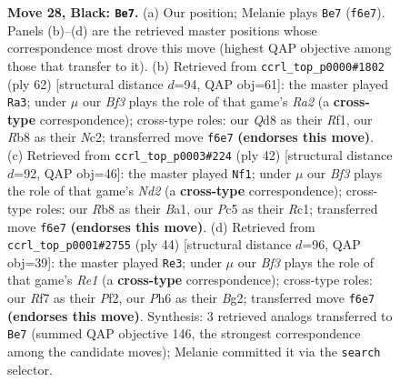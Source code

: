 \documentclass[11pt]{article}
\begin{document}
\begin{figure}[p]
\caption{\textbf{Move 28, Black: \texttt{Be7}.} (a) Our position; Melanie plays \texttt{Be7} (\texttt{f6e7}). Panels (b)--(d) are the retrieved master positions whose correspondence most drove this move (highest QAP objective among those that transfer to it). (b) Retrieved from \texttt{ccrl\_top\_p0000\#1802} (ply 62) [structural distance $d$=94, QAP obj=61]: the master played \texttt{Ra3}; under $\mu$ our \emph{Bf3} plays the role of that game's \emph{Ra2} (a \textbf{cross-type} correspondence); cross-type roles: our \emph{Q}d8 as their \emph{R}f1, our \emph{R}b8 as their \emph{N}c2; transferred move \texttt{f6e7} \textbf{(endorses this move)}. (c) Retrieved from \texttt{ccrl\_top\_p0003\#224} (ply 42) [structural distance $d$=92, QAP obj=46]: the master played \texttt{Nf1}; under $\mu$ our \emph{Bf3} plays the role of that game's \emph{Nd2} (a \textbf{cross-type} correspondence); cross-type roles: our \emph{R}b8 as their \emph{B}a1, our \emph{P}c5 as their \emph{R}c1; transferred move \texttt{f6e7} \textbf{(endorses this move)}. (d) Retrieved from \texttt{ccrl\_top\_p0001\#2755} (ply 44) [structural distance $d$=96, QAP obj=39]: the master played \texttt{Re3}; under $\mu$ our \emph{Bf3} plays the role of that game's \emph{Re1} (a \textbf{cross-type} correspondence); cross-type roles: our \emph{R}f7 as their \emph{P}f2, our \emph{P}h6 as their \emph{B}g2; transferred move \texttt{f6e7} \textbf{(endorses this move)}. Synthesis: 3 retrieved analogs transferred to \texttt{Be7} (summed QAP objective 146, the strongest correspondence among the candidate moves); Melanie committed it via the \texttt{search} selector.}
\label{fig:thought-m55}
\end{figure}

\clearpage
\end{document}
